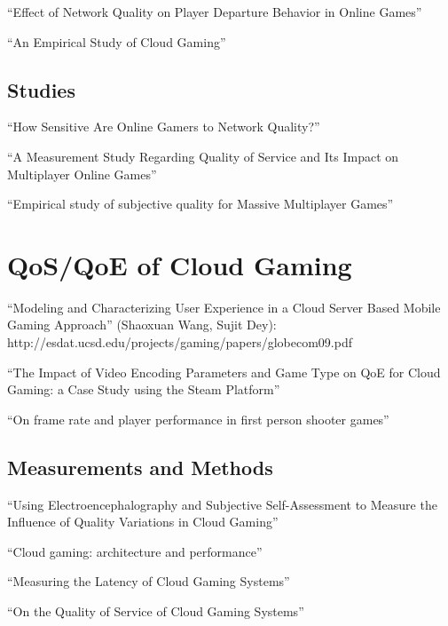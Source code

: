 ``Effect of Network Quality on Player Departure Behavior in Online Games'' \cite{4591393}

``An Empirical Study of Cloud Gaming'' \cite{Manzano:2012:ESC:2501560.2501582}

\subsection{Studies}

``How Sensitive Are Online Gamers to Network Quality?'' \cite{Chen:2006:SOG:1167838.1167859}

``A Measurement Study Regarding Quality of Service and Its Impact on Multiplayer Online Games'' \cite{Bredel:2010:MSR:1944796.1944797}

``Empirical study of subjective quality for Massive Multiplayer Games'' \cite{4604397}



\section{QoS/QoE of Cloud Gaming}



``Modeling and Characterizing User Experience in a Cloud Server Based Mobile Gaming Approach'' (Shaoxuan Wang, Sujit Dey): http://esdat.ucsd.edu/projects/gaming/papers/globecom09.pdf

``The Impact of Video Encoding Parameters and Game Type on QoE for Cloud Gaming: a Case Study using the Steam Platform'' \cite{slivarimpact}

``On frame rate and player performance in first person shooter games'' \cite{claypool2007}


\subsection{Measurements and Methods}
``Using Electroencephalography and Subjective Self-Assessment to Measure the Influence of Quality Variations in Cloud Gaming'' \cite{beyerusing}

``Cloud gaming: architecture and performance'' \cite{6574660}

``Measuring the Latency of Cloud Gaming Systems'' \cite{Chen:2011:MLC:2072298.2071991}

``On the Quality of Service of Cloud Gaming Systems'' \cite{6670099}

